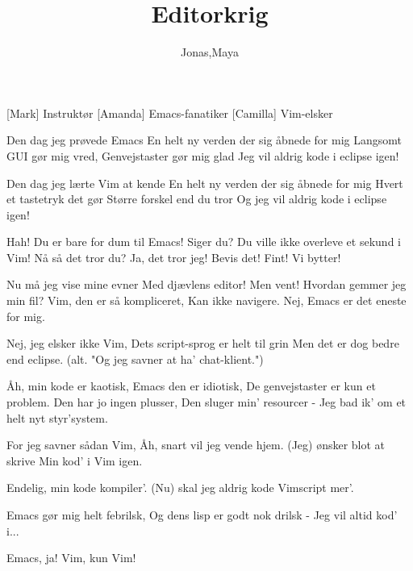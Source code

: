 \documentclass[11pt,a4paper]{article}
\title{Editorkrig}
\author{Jonas,Maya}
\begin{document}
\maketitle

\begin{roles}
 [Mark] Instruktør
    [Amanda] Emacs-fanatiker
    [Camilla] Vim-elsker
\end{roles}

\begin{song}

 Den dag jeg prøvede Emacs
En helt ny verden der sig åbnede for mig
Langsomt GUI gør mig vred,
Genvejstaster gør mig glad
Jeg vil aldrig kode i eclipse igen!

 Den dag jeg lærte Vim at kende
En helt ny verden der sig åbnede for mig
Hvert et tastetryk det gør
Større forskel end du tror
Og jeg vil aldrig kode i eclipse igen!

 Hah! Du er bare for dum til Emacs!
 Siger du? Du ville ikke overleve et sekund i Vim!
 Nå så det tror du?
 Ja, det tror jeg!
 Bevis det!
 Fint!
 Vi bytter!

 Nu må jeg vise mine evner
Med djævlens editor!
Men vent! Hvordan gemmer jeg min fil?
Vim, den er så kompliceret,
Kan ikke navigere.
Nej, Emacs er det eneste for mig.

Nej, jeg elsker ikke Vim,
Dets script-sprog er helt til grin
Men det er dog bedre end eclipse. (alt. "Og jeg savner at ha' chat-klient.")

 Åh, min kode er kaotisk,
Emacs den er idiotisk,
De genvejstaster er kun et problem.
Den har jo ingen plusser,
Den sluger min’ resourcer -
Jeg bad ik' om et helt nyt styr’system.

For jeg savner sådan Vim,
Åh, snart vil jeg vende hjem.
(Jeg) ønsker blot at skrive
Min kod’ i Vim igen.

 Endelig, min kode kompiler'.
(Nu) skal jeg aldrig kode Vimscript mer'.

 Emacs gør mig helt febrilsk,
Og dens lisp er godt nok drilsk -
Jeg vil altid kod' i...

 Emacs, ja!
 Vim, kun Vim!

\end{song}
\end{document}
